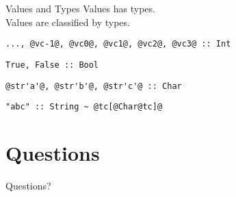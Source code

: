 \documentclass[xcolor={usenames,dvipsnames}]{beamer}
\begin{document}
\begin{frame}[fragile]{Values and Types}
  Values has types.\\
  Values are classified by types.\\

  \begin{lstlisting}[style=hask]
    ..., @vc-1@, @vc0@, @vc1@, @vc2@, @vc3@ :: Int
  \end{lstlisting}
  \begin{lstlisting}[style=hask]
    True, False :: Bool
  \end{lstlisting}
  \begin{lstlisting}[style=hask]
    @str'a'@, @str'b'@, @str'c'@ :: Char
  \end{lstlisting}
  \begin{lstlisting}[style=hask]
    "abc" :: String ~ @tc[@Char@tc]@
  \end{lstlisting}
\end{frame}


\section{Questions}

\begin{frame}
  Questions?
\end{frame}
\end{document}
